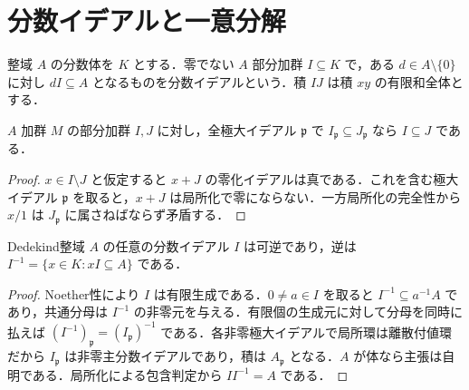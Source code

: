 \section{分数イデアルと一意分解}
\begin{defn}[分数イデアル]
整域 $A$ の分数体を $K$ とする．零でない $A$ 部分加群 $I\subseteq K$ で，ある $d\in A\setminus\{0\}$ に対し $dI\subseteq A$ となるものを分数イデアルという．積 $IJ$ は積 $xy$ の有限和全体とする．
\end{defn}
\begin{prop}[局所化による包含判定]
$A$ 加群 $M$ の部分加群 $I,J$ に対し，全極大イデアル $\mathfrak p$ で $I_{\mathfrak p}\subseteq J_{\mathfrak p}$ なら $I\subseteq J$ である．
\end{prop}
\begin{proof}
$x\in I\setminus J$ と仮定すると $x+J$ の零化イデアルは真である．これを含む極大イデアル $\mathfrak p$ を取ると，$x+J$ は局所化で零にならない．一方局所化の完全性から $x/1$ は $J_{\mathfrak p}$ に属さねばならず矛盾する．
\end{proof}
\begin{prop}[分数イデアルの可逆性]
Dedekind整域 $A$ の任意の分数イデアル $I$ は可逆であり，逆は $I^{-1}=\{x\in K:xI\subseteq A\}$ である．
\end{prop}
\begin{proof}
Noether性により $I$ は有限生成である．$0\ne a\in I$ を取ると $I^{-1}\subseteq a^{-1}A$ であり，共通分母は $I^{-1}$ の非零元を与える．有限個の生成元に対して分母を同時に払えば $(I^{-1})_{\mathfrak p}=(I_{\mathfrak p})^{-1}$ である．各非零極大イデアルで局所環は離散付値環だから $I_{\mathfrak p}$ は非零主分数イデアルであり，積は $A_{\mathfrak p}$ となる．$A$ が体なら主張は自明である．局所化による包含判定から $II^{-1}=A$ である．
\end{proof}
